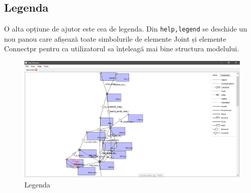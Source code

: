 \subsection{Legenda}
O alta opțiune de ajutor este cea de legenda. 
Din \verb|help,legend| se deschide un nou panou care afișează toate simbolurile de elemente Joint și elemente Connectpr pentru ca 
utilizatorul sa înțeleagă mai bine structura modelului.\newline 

\begin{figure}[H]
    \includegraphics[width=\linewidth]{imagini/implementare/legend.png}
    \caption{Legenda}
    \label{fig:tabs}
\end{figure}
